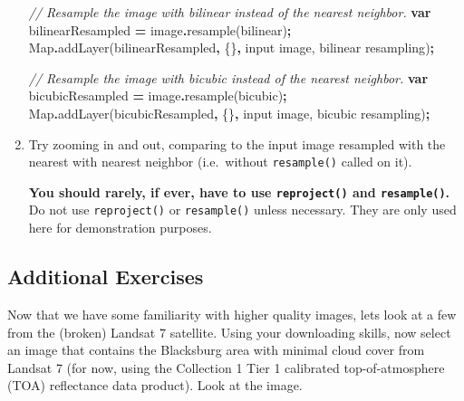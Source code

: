 \documentclass[
]{article}
\newenvironment{Shaded}{\begin{snugshade}}{\end{snugshade}}
\newcommand{\BuiltInTok}[1]{#1}
\newcommand{\CommentTok}[1]{\textcolor[rgb]{0.56,0.35,0.01}{\textit{#1}}}
\newcommand{\FunctionTok}[1]{\textcolor[rgb]{0.00,0.00,0.00}{#1}}
\newcommand{\KeywordTok}[1]{\textcolor[rgb]{0.13,0.29,0.53}{\textbf{#1}}}
\newcommand{\NormalTok}[1]{#1}
\newcommand{\OperatorTok}[1]{\textcolor[rgb]{0.81,0.36,0.00}{\textbf{#1}}}
\newcommand{\StringTok}[1]{\textcolor[rgb]{0.31,0.60,0.02}{#1}}
\begin{document}
\begin{enumerate}
\begin{Shaded}
\begin{Highlighting}[]
\CommentTok{// Resample the image with bilinear instead of the nearest neighbor.}
\KeywordTok{var}\NormalTok{ bilinearResampled }\OperatorTok{=}\NormalTok{ image}\OperatorTok{.}\FunctionTok{resample}\NormalTok{(}\StringTok{\textquotesingle{}bilinear\textquotesingle{}}\NormalTok{)}\OperatorTok{;}
\BuiltInTok{Map}\OperatorTok{.}\FunctionTok{addLayer}\NormalTok{(bilinearResampled}\OperatorTok{,}\NormalTok{ \{\}}\OperatorTok{,} \StringTok{\textquotesingle{}input image, bilinear resampling\textquotesingle{}}\NormalTok{)}\OperatorTok{;}

\CommentTok{// Resample the image with bicubic instead of the nearest neighbor.}
\KeywordTok{var}\NormalTok{ bicubicResampled }\OperatorTok{=}\NormalTok{ image}\OperatorTok{.}\FunctionTok{resample}\NormalTok{(}\StringTok{\textquotesingle{}bicubic\textquotesingle{}}\NormalTok{)}\OperatorTok{;}
\BuiltInTok{Map}\OperatorTok{.}\FunctionTok{addLayer}\NormalTok{(bicubicResampled}\OperatorTok{,}\NormalTok{ \{\}}\OperatorTok{,} \StringTok{\textquotesingle{}input image, bicubic resampling\textquotesingle{}}\NormalTok{)}\OperatorTok{;}
\end{Highlighting}
\end{Shaded}
\item
  Try zooming in and out, comparing to the input image resampled with the nearest with nearest neighbor (i.e.~without \texttt{resample()} called on it).

  \textbf{You should rarely, if ever, have to use \texttt{reproject()} and \texttt{resample()}.} Do not use \texttt{reproject()} or \texttt{resample()} unless necessary. They are only used here for demonstration purposes.
\end{enumerate}

\hypertarget{additional-exercises}{%
\subsection{Additional Exercises}\label{additional-exercises}}

Now that we have some familiarity with higher quality images, lets look at a few from the (broken) Landsat 7 satellite. Using your downloading skills, now select an image that contains the Blacksburg area with minimal cloud cover from Landsat 7 (for now, using the Collection 1 Tier 1 calibrated top-of-atmosphere (TOA) reflectance data product). Look at the image.
\end{document}
